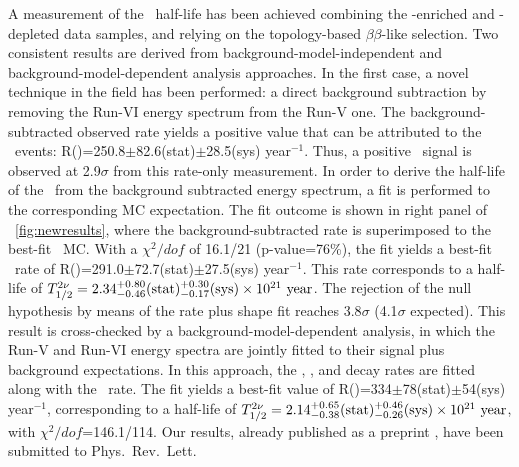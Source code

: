 A measurement of the  \bbtnu ~half-life has been achieved combining the -enriched and -depleted data samples, and relying on the topology-based $\beta\beta$-like selection. Two consistent results are derived from background-model-independent and background-model-dependent analysis approaches. In the first case, a novel technique in the field has been performed: a direct background subtraction by removing the Run-VI energy spectrum from the Run-V one. The background-subtracted observed rate yields a positive value that can be attributed to the \bbtnu ~events: R()=250.8$\pm$82.6(stat)$\pm$28.5(sys) year$^{-1}$. Thus, a positive \bbtnu ~signal is observed at 2.9$\sigma$ from this rate-only measurement. In order to derive the half-life of the  \bbtnu\ from the background subtracted energy spectrum, a fit is performed to the corresponding MC expectation. The fit outcome is shown in right panel of \fig\ \ref{fig:newresults}, where the background-subtracted rate is superimposed to the best-fit \bbtnu ~MC. With a $\chi^{2}/dof$ of 16.1/21 (p-value=76\%), the fit yields a best-fit \bbtnu ~rate of R()=291.0$\pm$72.7(stat)$\pm$27.5(sys) year$^{-1}$. This rate corresponds to a half-life of $T_{1/2}^{2\nu}=2.34^{+0.80}_{-0.46}(\textrm{stat})^{+0.30}_{-0.17}(\textrm{sys})\times10^{21}~\textrm{year}$. The rejection of the null hypothesis by means of the rate plus shape fit reaches 3.8$\sigma$ (4.1$\sigma$ expected). This result is cross-checked by a background-model-dependent analysis, in which the Run-V and Run-VI energy spectra are jointly fitted to their signal plus background expectations. In this approach, the , ,  and  decay rates are fitted along with the \bbtnu ~rate. The fit yields a best-fit value of R()=334$\pm$78(stat)$\pm$54(sys) year$^{-1}$, corresponding to a half-life of $T_{1/2}^{2\nu}=2.14^{+0.65}_{-0.38}(\textrm{stat})^{+0.46}_{-0.26}(\textrm{sys})\times10^{21}~\textrm{year}$, with $\chi^2/dof$=146.1/114. Our results, already published as
a preprint \cite{nextcollaboration2021measurement}, have been submitted to Phys.~Rev.~Lett. 


